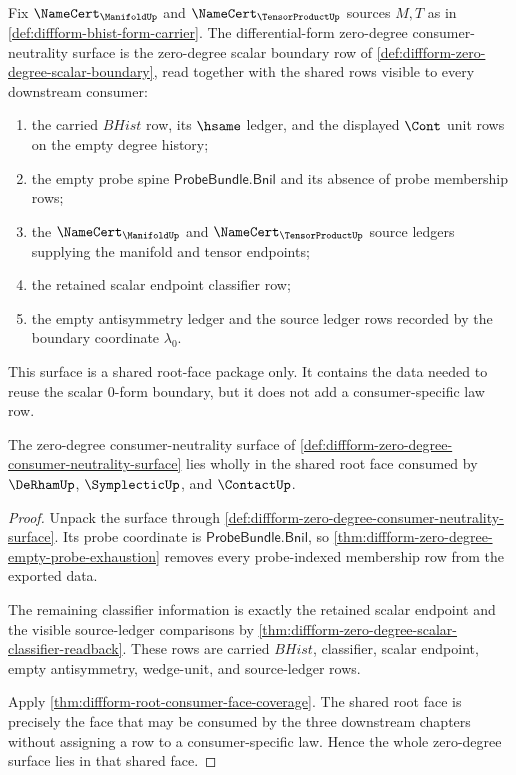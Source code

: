 \begin{definition}
\label{def:diffform-zero-degree-consumer-neutrality-surface}
Fix $\NameCert_{\ManifoldUp}$ and $\NameCert_{\TensorProductUp}$ sources
$M,T$ as in \autoref{def:diffform-bhist-form-carrier}. The differential-form
zero-degree consumer-neutrality surface is the zero-degree scalar boundary row
of \autoref{def:diffform-zero-degree-scalar-boundary}, read together with the
shared rows visible to every downstream consumer:
\begin{enumerate}
  \item the carried $BHist$ row, its $\hsame$ ledger, and the displayed
  $\Cont$ unit rows on the empty degree history;
  \item the empty probe spine $\mathsf{ProbeBundle.Bnil}$ and its absence of
  probe membership rows;
  \item the $\NameCert_{\ManifoldUp}$ and $\NameCert_{\TensorProductUp}$
  source ledgers supplying the manifold and tensor endpoints;
  \item the retained scalar endpoint classifier row;
  \item the empty antisymmetry ledger and the source ledger rows recorded by
  the boundary coordinate $\lambda_0$.
\end{enumerate}
This surface is a shared root-face package only. It contains the data needed to
reuse the scalar $0$-form boundary, but it does not add a consumer-specific
law row.
\end{definition}

\begin{theorem}
\label{thm:diffform-zero-degree-shared-consumer-face}
The zero-degree consumer-neutrality surface of
\autoref{def:diffform-zero-degree-consumer-neutrality-surface} lies wholly in
the shared root face consumed by $\DeRhamUp$, $\SymplecticUp$, and
$\ContactUp$.
\end{theorem}
\begin{proof}
Unpack the surface through
\autoref{def:diffform-zero-degree-consumer-neutrality-surface}. Its probe
coordinate is $\mathsf{ProbeBundle.Bnil}$, so
\autoref{thm:diffform-zero-degree-empty-probe-exhaustion} removes every
probe-indexed membership row from the exported data.

The remaining classifier information is exactly the retained scalar endpoint
and the visible source-ledger comparisons by
\autoref{thm:diffform-zero-degree-scalar-classifier-readback}. These rows are
carried $BHist$, classifier, scalar endpoint, empty antisymmetry, wedge-unit,
and source-ledger rows.

Apply \autoref{thm:diffform-root-consumer-face-coverage}. The shared root
face is precisely the face that may be consumed by the three downstream
chapters without assigning a row to a consumer-specific law. Hence the whole
zero-degree surface lies in that shared face.
\end{proof}


